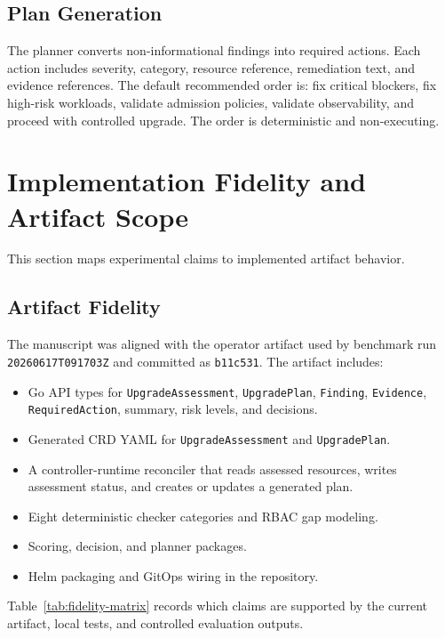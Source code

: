 \documentclass[10pt,journal]{IEEEtran}
\newcommand{\crd}[1]{\texttt{#1}}
\newcommand{\code}[1]{\texttt{#1}}
\begin{document}
\subsection{Plan Generation}
The planner converts non-informational findings into required actions. Each action includes severity, category, resource reference, remediation text, and evidence references. The default recommended order is: fix critical blockers, fix high-risk workloads, validate admission policies, validate observability, and proceed with controlled upgrade. The order is deterministic and non-executing.

\section{Implementation Fidelity and Artifact Scope}
\label{sec:fidelity}
This section maps experimental claims to implemented artifact behavior.

\subsection{Artifact Fidelity}
The manuscript was aligned with the operator artifact used by benchmark run \code{20260617T091703Z} and committed as \code{b11c531}. The artifact includes:
\begin{itemize}[leftmargin=*]
  \item Go API types for \crd{UpgradeAssessment}, \crd{UpgradePlan}, \code{Finding}, \code{Evidence}, \code{RequiredAction}, summary, risk levels, and decisions.
  \item Generated CRD YAML for \crd{UpgradeAssessment} and \crd{UpgradePlan}.
  \item A controller-runtime reconciler that reads assessed resources, writes assessment status, and creates or updates a generated plan.
  \item Eight deterministic checker categories and RBAC gap modeling.
  \item Scoring, decision, and planner packages.
  \item Helm packaging and GitOps wiring in the repository.
\end{itemize}

Table~\ref{tab:fidelity-matrix} records which claims are supported by the current artifact, local tests, and controlled evaluation outputs.
\end{document}
